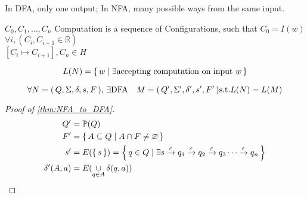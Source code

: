 In DFA, only one output; 
In NFA, many possible ways from the same input.

    $C_0, C_1, \dots , C_n$
    Computation is a sequence of Configurations, such that $C_0 = I(w)$
    $\forall i, (C_i, C_{i+1} \in \mathbb{R})$ \\
    $[C_i \mapsto C_{i+1}], C_n \in H $ \\
    \newpage


\begin{definition}
    \[
        L(N) = { \left\{\,w \mid \exists \text{accepting computation on input $w$} \,\right\} }
    \]
\end{definition}

\begin{theorem}
    \label{thm:NFA_to_DFA}
    \[
        \forall { N = { \left(\,Q, \Sigma, \delta, s, F\,\right) } },\,
        \exists \text{\upshape DFA} \quad M = { \left(\, Q', \Sigma', \delta', s', F'\,\right) } \text{s.t.}
        L(N) = L(M)
    \]
\end{theorem}

\begin{proof}[Proof of \autoref{thm:NFA_to_DFA}]
    \begin{align*}
        Q' &= \mathbb{P}(Q) \\
        F' &= { \left\{\, A \subseteq Q \mid A \cap F \neq \varnothing\,\right\} } \\
        s' &= E({ \left\{\,s\,\right\} })  = { \left\{\,q \in Q \mid \exists s
                                                \xrightarrow\varepsilon q_1
                                                \xrightarrow\varepsilon q_2
                                                \xrightarrow\varepsilon q_3
                                                \cdots 
                                                \xrightarrow\varepsilon q_n
        \,\right\} } \\
        \delta'(A, a) &= E( \operatorname*\cup_{q \in A} \delta (q,a) )
    \end{align*}
\end{proof}
